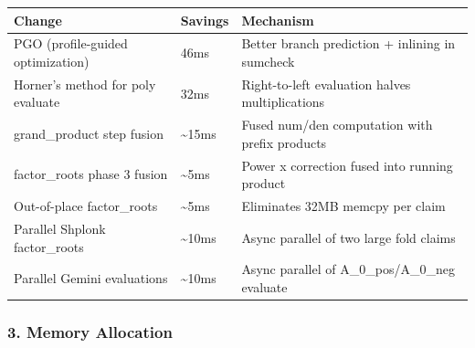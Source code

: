 \documentclass[
]{article}
\newcounter{none} %
\begin{document}
{\def\LTcaptype{none} %
\begin{longtable}[]{@{}
  >{\raggedright\arraybackslash}p{}
  >{\raggedleft\arraybackslash}p{}
  >{\raggedright\arraybackslash}p{}@{}}
\toprule\noalign{}
\begin{minipage}[b]{\linewidth}\raggedright
Change
\end{minipage} & \begin{minipage}[b]{\linewidth}\raggedleft
Savings
\end{minipage} & \begin{minipage}[b]{\linewidth}\raggedright
Mechanism
\end{minipage} \\
\midrule\noalign{}
\endhead
\bottomrule\noalign{}
\endlastfoot
PGO (profile-guided optimization) & 46ms & Better branch prediction +
inlining in sumcheck \\
Horner's method for poly evaluate & 32ms & Right-to-left evaluation
halves multiplications \\
grand\_product step fusion & \textasciitilde15ms & Fused num/den
computation with prefix products \\
factor\_roots phase 3 fusion & \textasciitilde5ms & Power x correction
fused into running product \\
Out-of-place factor\_roots & \textasciitilde5ms & Eliminates 32MB memcpy
per claim \\
Parallel Shplonk factor\_roots & \textasciitilde10ms & Async parallel of
two large fold claims \\
Parallel Gemini evaluations & \textasciitilde10ms & Async parallel of
A\_0\_pos/A\_0\_neg evaluate \\
\end{longtable}
}

\subsubsection{3. Memory Allocation}\label{memory-allocation}
\end{document}
